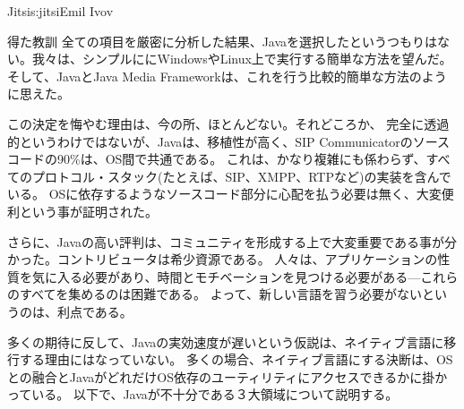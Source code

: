 \begin{aosachapter}{Jitsi}{s:jitsi}{Emil Ivov}
\begin{aosasect1}{得た教訓}
全ての項目を厳密に分析した結果、Javaを選択したというつもりはない。我々は、シンプルににWindowsやLinux上で実行する簡単な方法を望んだ。
そして、JavaとJava Media Frameworkは、これを行う比較的簡単な方法のように思えた。

この決定を悔やむ理由は、今の所、ほとんどない。それどころか、
完全に透過的というわけではないが、Javaは、移植性が高く、SIP Communicatorのソースコードの90\%は、OS間で共通である。
これは、かなり複雑にも係わらず、すべてのプロトコル・スタック(たとえば、SIP、XMPP、RTPなど)の実装を含んでいる。
OSに依存するようなソースコード部分に心配を払う必要は無く、大変便利という事が証明された。

さらに、Javaの高い評判は、コミュニティを形成する上で大変重要である事が分かった。コントリビュータは希少資源である。
人々は、アプリケーションの性質を気に入る必要があり、時間とモチベーションを見つける必要がある---これらのすべてを集めるのは困難である。
よって、新しい言語を習う必要がないというのは、利点である。

多くの期待に反して、Javaの実効速度が遅いという仮説は、ネイティブ言語に移行する理由にはなっていない。
多くの場合、ネイティブ言語にする決断は、OSとの融合とJavaがどれだけOS依存のユーティリティにアクセスできるかに掛かっている。
以下で、Javaが不十分である３大領域について説明する。


\end{aosasect1}
\end{aosachapter}
